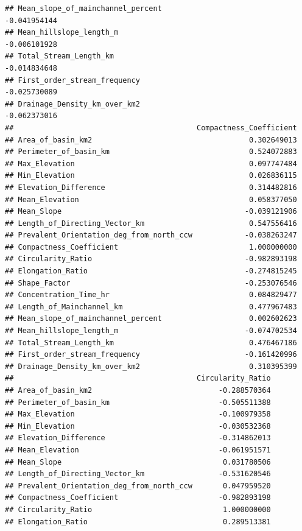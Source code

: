 \documentclass[11pt,]{article}
\begin{document}
\begin{verbatim}
## Mean_slope_of_mainchannel_percent                                    -0.041954144
## Mean_hillslope_length_m                                              -0.006101928
## Total_Stream_Length_km                                               -0.014834648
## First_order_stream_frequency                                         -0.025730089
## Drainage_Density_km_over_km2                                         -0.062373016
##                                          Compactness_Coefficient
## Area_of_basin_km2                                    0.302649013
## Perimeter_of_basin_km                                0.524072883
## Max_Elevation                                        0.097747484
## Min_Elevation                                        0.026836115
## Elevation_Difference                                 0.314482816
## Mean_Elevation                                       0.058377050
## Mean_Slope                                          -0.039121906
## Length_of_Directing_Vector_km                        0.547556416
## Prevalent_Orientation_deg_from_north_ccw            -0.038263247
## Compactness_Coefficient                              1.000000000
## Circularity_Ratio                                   -0.982893198
## Elongation_Ratio                                    -0.274815245
## Shape_Factor                                        -0.253076546
## Concentration_Time_hr                                0.084829477
## Length_of_Mainchannel_km                             0.477967483
## Mean_slope_of_mainchannel_percent                    0.002602623
## Mean_hillslope_length_m                             -0.074702534
## Total_Stream_Length_km                               0.476467186
## First_order_stream_frequency                        -0.161420996
## Drainage_Density_km_over_km2                         0.310395399
##                                          Circularity_Ratio
## Area_of_basin_km2                             -0.288570364
## Perimeter_of_basin_km                         -0.505511388
## Max_Elevation                                 -0.100979358
## Min_Elevation                                 -0.030532368
## Elevation_Difference                          -0.314862013
## Mean_Elevation                                -0.061951571
## Mean_Slope                                     0.031780506
## Length_of_Directing_Vector_km                 -0.531620546
## Prevalent_Orientation_deg_from_north_ccw       0.047959520
## Compactness_Coefficient                       -0.982893198
## Circularity_Ratio                              1.000000000
## Elongation_Ratio                               0.289513381

\end{verbatim}
\end{document}
